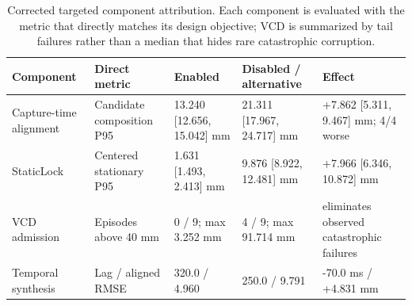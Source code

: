 \begin{table}[t]
\centering
\caption{Corrected targeted component attribution. Each component is evaluated with the metric that directly matches its design objective; VCD is summarized by tail failures rather than a median that hides rare catastrophic corruption.}
\label{tab:exp2-corrected-new}
\small
\setlength{\tabcolsep}{4.8pt}
\begin{tabular}{lllll}
\toprule
Component & Direct metric & Enabled & Disabled / alternative & Effect \\
\midrule
Capture-time alignment & Candidate composition P95 & 13.240 [12.656, 15.042] mm & 21.311 [17.967, 24.717] mm & +7.862 [5.311, 9.467] mm; 4/4 worse \\
StaticLock & Centered stationary P95 & 1.631 [1.493, 2.413] mm & 9.876 [8.922, 12.481] mm & +7.966 [6.346, 10.872] mm \\
VCD admission & Episodes above 40 mm & 0 / 9; max 3.252 mm & 4 / 9; max 91.714 mm & eliminates observed catastrophic failures \\
Temporal synthesis & Lag / aligned RMSE & 320.0 / 4.960 & 250.0 / 9.791 & -70.0 ms / +4.831 mm \\
\bottomrule
\end{tabular}
\end{table}